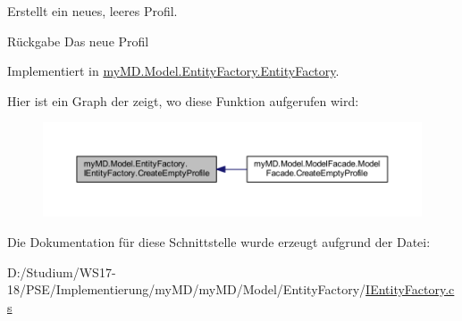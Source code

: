 Erstellt ein neues, leeres Profil. 

\begin{DoxyReturn}{Rückgabe}
Das neue Profil
\end{DoxyReturn}


Implementiert in \mbox{\hyperlink{classmy_m_d_1_1_model_1_1_entity_factory_1_1_entity_factory_ac48b89bd93d6f39965d805b5f6af5f35}{my\+M\+D.\+Model.\+Entity\+Factory.\+Entity\+Factory}}.

Hier ist ein Graph der zeigt, wo diese Funktion aufgerufen wird\+:
\nopagebreak
\begin{figure}[H]
\begin{center}
\leavevmode
\includegraphics[width=350pt]{interfacemy_m_d_1_1_model_1_1_entity_factory_1_1_i_entity_factory_add734631a85e6021f04c4185f66e351d_icgraph}
\end{center}
\end{figure}


Die Dokumentation für diese Schnittstelle wurde erzeugt aufgrund der Datei\+:\begin{DoxyCompactItemize}
\item 
D\+:/\+Studium/\+W\+S17-\/18/\+P\+S\+E/\+Implementierung/my\+M\+D/my\+M\+D/\+Model/\+Entity\+Factory/\mbox{\hyperlink{_i_entity_factory_8cs}{I\+Entity\+Factory.\+cs}}\end{DoxyCompactItemize}
